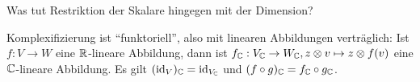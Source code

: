 \begin{sheet}
\begin{problem}[title={Komplexifizierung}]
\begin{subproblem}
Was tut Restriktion der Skalare hingegen mit der Dimension?
\end{subproblem}

\begin{subproblem}
Komplexifizierung ist \enquote{funktoriell}, also mit linearen Abbildungen verträglich: Ist $f:V\to W$ eine $\mathbb{R}$-lineare Abbildung, dann ist $f_{\mathbb{C}}: V_{\mathbb{C}}\to W_{\mathbb{C}}, z\otimes v \mapsto z\otimes f(v)$ eine $\mathbb{C}$-lineare Abbildung. Es gilt $(\operatorname{id}_V)_{\mathbb{C}}=\operatorname{id}_{V_{\mathbb{C}}}$ und $(f\circ g)_{\mathbb{C}}=f_{\mathbb{C}}\circ g_{\mathbb{C}}$.
\end{subproblem}
\end{problem}

\end{sheet}